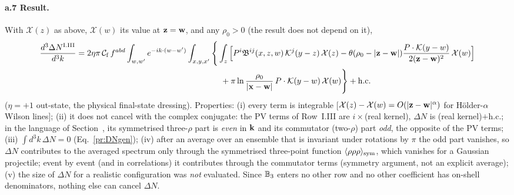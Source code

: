 \paragraph{a.7 Result.} With $\mathcal X(z)$ as above, $\mathcal X(w)$ its value at $\mathbf{z}=\mathbf{w}$, and any $\rho_0>0$ (the result does not depend on it),
\begin{align}\label{pr:DN}
\frac{d^3\Delta N^{\rm I.III}}{d^3k}&=2\eta\pi\,\mathcal C_{\rm f}\,f^{abd}\int_{w,w'}e^{-ik\cdot(w-w')}\int_{x,y,x'}\Bigg\{\int_z\Big[P^i\mathfrak B^{ij}(x,z,w)\,\Kv^j(y-z)\,\mathcal X(z)-\theta(\rho_0-|\v z-\v w|)\frac{P\cdot\Kv(y-w)}{2(\v z-\v w)^2}\,\mathcal X(w)\Big]\notag\\
&\hspace{6.2cm}+\pi\ln\frac{\rho_0}{|\v x-\v w|}\,P\cdot\Kv(y-w)\,\mathcal X(w)\Bigg\}+{\rm h.c.}
\end{align}
($\eta=+1$ out-state, the physical final-state dressing). Properties: (i) every term is integrable [$\mathcal X(z)-\mathcal X(w)=O(|\mathbf{z}-\mathbf{w}|^\alpha)$ for H\"older-$\alpha$ Wilson lines]; (ii) it does not cancel with the complex conjugate: the PV terms of Row~I.III are $i\times$(real kernel), $\Delta N$ is (real kernel)$+$h.c.; in the language of Section~, its symmetrised three-$\rho$ part is \emph{even} in $\mathbf{k}$ and its commutator (two-$\rho$) part \emph{odd}, the opposite of the PV terms; (iii) $\int d^3k\,\Delta N=0$ (Eq.~\eqref{pr:DNgen}); (iv) after an average over an ensemble that is invariant under rotations by $\pi$ the odd part vanishes, so $\Delta N$ contributes to the averaged spectrum only through the symmetrised three-point function $\langle\rho\rho\rho\rangle_{\rm sym}$, which vanishes for a Gaussian projectile; event by event (and in correlations) it contributes through the commutator terms (symmetry argument, not an explicit average); (v) the size of $\Delta N$ for a realistic configuration was \emph{not} evaluated. Since $\mathbb{B}_3$ enters no other row and no other coefficient has on-shell denominators, nothing else can cancel $\Delta N$.

